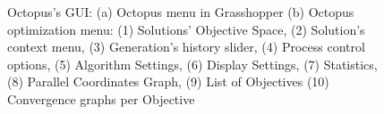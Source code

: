 	\begin{figure}[h!]
		\centering
		\hfill
		\caption[Octopus GUI]{Octopus's \ac{GUI}: (a) Octopus menu in Grasshopper (b) Octopus optimization menu: (1) Solutions' Objective Space, (2) Solution's context menu, (3) Generation's history slider, (4) Process control options, (5) Algorithm Settings, (6) Display Settings, (7) Statistics, (8) Parallel Coordinates Graph, (9) List of Objectives (10) Convergence graphs per Objective}
		\label{fig:octopus}
	\end{figure}
	
